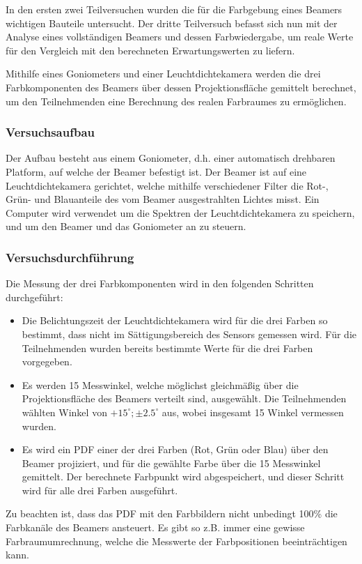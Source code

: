 
In den ersten zwei Teilversuchen wurden die für die Farbgebung eines Beamers wichtigen Bauteile untersucht. Der dritte Teilversuch befasst sich nun mit der Analyse eines vollständigen Beamers und dessen Farbwiedergabe, um reale Werte für den Vergleich mit den berechneten Erwartungswerten zu liefern.

Mithilfe eines Goniometers und einer Leuchtdichtekamera werden die drei Farbkomponenten des Beamers über dessen Projektionsfläche gemittelt berechnet, um den Teilnehmenden eine Berechnung des realen Farbraumes zu ermöglichen.

\subsubsection{Versuchsaufbau}

Der Aufbau besteht aus einem Goniometer, d.h. einer automatisch drehbaren Platform, auf welche der Beamer befestigt ist. Der Beamer ist auf eine Leuchtdichtekamera gerichtet, welche mithilfe verschiedener Filter die Rot-, Grün- und Blauanteile des vom Beamer ausgestrahlten Lichtes misst. Ein Computer wird verwendet um die Spektren der Leuchtdichtekamera zu speichern, und um den Beamer und das Goniometer an zu steuern.

\subsubsection{Versuchsdurchführung}

Die Messung der drei Farbkomponenten wird in den folgenden Schritten durchgeführt:
\begin{itemize}
\item Die Belichtungszeit der Leuchtdichtekamera wird für die drei Farben so bestimmt, dass nicht im Sättigungsbereich des Sensors gemessen wird. Für die Teilnehmenden wurden bereits bestimmte Werte für die drei Farben vorgegeben.
\item Es werden 15 Messwinkel, welche möglichst gleichmäßig über die Projektionsfläche des Beamers verteilt sind, ausgewählt. Die Teilnehmenden wählten Winkel von $+15^\circ;\pm2.5^\circ$ aus, wobei insgesamt 15 Winkel vermessen wurden.
\item Es wird ein PDF einer der drei Farben (Rot, Grün oder Blau) über den Beamer projiziert, und für die gewählte Farbe über die 15 Messwinkel gemittelt. Der berechnete Farbpunkt wird abgespeichert, und dieser Schritt wird für alle drei Farben ausgeführt.
\end{itemize}

Zu beachten ist, dass das PDF mit den Farbbildern nicht unbedingt 100\% die Farbkanäle des Beamers ansteuert. Es gibt so z.B. immer eine gewisse Farbraumumrechnung, welche die Messwerte der Farbpositionen beeinträchtigen kann.